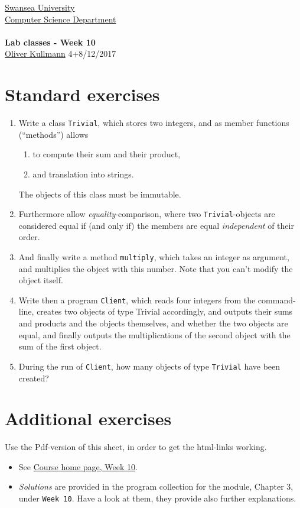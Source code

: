 \documentclass[11pt]{article}
\newcommand{\Java}{\lstset{language=Java,keywordstyle=\bfseries,breaklines,breakindent=30pt}}
\begin{document}
\begin{center}
  \href{http://www.swan.ac.uk/}{Swansea University}\\
  \href{http://www.swan.ac.uk/compsci/}{Computer Science Department}\\[1ex]
  \href{\chp}{\module}\\[1ex]
  \textbf{Lab classes - Week 10}\\
  \href{http://cs.swan.ac.uk/~csoliver}{Oliver Kullmann} 4+8/12/2017
\end{center}


\section{Standard exercises}
\label{sec:stdex}

\Java

\begin{enumerate}
\item Write a class \texttt{Trivial}, which stores two integers, and as member functions (``methods'') allows
  \begin{enumerate}
  \item to compute their sum and their product,
  \item and translation into strings.
  \end{enumerate}
 The objects of this class must be immutable.
\item Furthermore allow \emph{equality}-comparison, where two \texttt{Trivial}-objects are considered equal if (and only if) the members are equal \emph{independent} of their order.
\item And finally write a method \texttt{multiply}, which takes an integer as argument, and multiplies the object with this number. Note that you can't modify the object itself.
\item Write then a program \texttt{Client}, which reads four integers from the command-line, creates two objects of type Trivial accordingly, and outputs their sums and products and the objects themselves, and whether the two objects are equal, and finally outputs the multiplications of the second object with the sum of the first object.
\item During the run of \texttt{Client}, how many objects of type \texttt{Trivial} have been created?
\end{enumerate}


\section{Additional exercises}
\label{sec:addex}

Use the Pdf-version of this sheet, in order to get the html-links working.
\begin{itemize}
\item See \href{\chp#ExercisesWeek10}{Course home page, Week 10}.
\item \emph{Solutions} are provided in the program collection for the module, Chapter 3, under \texttt{Week 10}. Have a look at them, they provide also further explanations.
\end{itemize}
\end{document}
